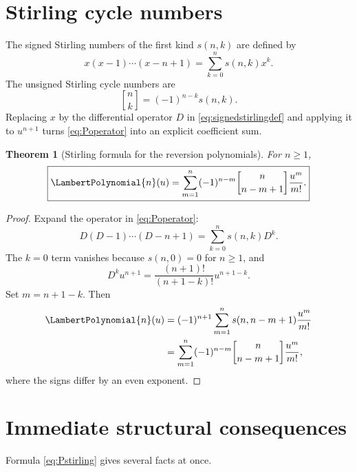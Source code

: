 \documentclass[11pt,oneside,openany]{book}
\newtheorem{theorem}{Theorem}[chapter]
\newcommand{\UnsignedStirlingFirstKind}[2]{%
  \genfrac{[}{]}{0pt}{}{#1}{#2}%
}
\begin{document}
\section{Stirling cycle numbers}
The signed Stirling numbers of the first kind \(s(n,k)\) are defined by
\begin{equation}\label{eq:signedstirlingdef}
 x(x-1)\cdots(x-n+1)=\sum_{k=0}^{n}s(n,k)x^k.
\end{equation}
The unsigned Stirling cycle numbers are
\begin{equation}\label{eq:unsignedstirling}
 \UnsignedStirlingFirstKind{n}{k}=(-1)^{n-k}s(n,k).
\end{equation}
Replacing \(x\) by the differential operator \(D\) in
\cref{eq:signedstirlingdef} and applying it to \(u^{n+1}\) turns
\cref{eq:Poperator} into an explicit coefficient sum.

\begin{theorem}[Stirling formula for the reversion polynomials]
\label{thm:Pstirling}
For \(n\geq1\),
\begin{equation}\label{eq:Pstirling}
 \boxed{
 \LambertPolynomial{n}(u)=\sum_{m=1}^{n}
 (-1)^{n-m}\UnsignedStirlingFirstKind{n}{n-m+1}\frac{u^m}{m!}.
 }
\end{equation}
\end{theorem}

\begin{proof}
Expand the operator in \cref{eq:Poperator}:
\[
 D(D-1)\cdots(D-n+1)=\sum_{k=0}^{n}s(n,k)D^k.
\]
The \(k=0\) term vanishes because \(s(n,0)=0\) for \(n\geq1\), and
\[
 D^ku^{n+1}=\frac{(n+1)!}{(n+1-k)!}u^{n+1-k}.
\]
Set \(m=n+1-k\).  Then
\begin{align*}
 \LambertPolynomial{n}(u)
 &=(-1)^{n+1}
   \sum_{m=1}^{n}s(n,n-m+1)\frac{u^m}{m!}\\
 &=\sum_{m=1}^{n}
   (-1)^{n-m}\UnsignedStirlingFirstKind{n}{n-m+1}\frac{u^m}{m!},
\end{align*}
where the signs differ by an even exponent.
\end{proof}

\section{Immediate structural consequences}
Formula \cref{eq:Pstirling} gives several facts at once.
\end{document}
